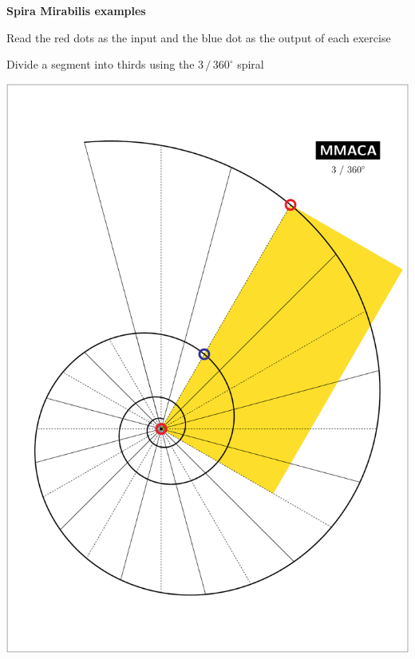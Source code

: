 \documentclass[a4paper,12pt]{article}
\begin{document}
    \newpage


    \phantom{.}
    \vspace{26em}

    {\huge \bf Spira Mirabilis examples}

    \bigskip

    {\large Read the red dots as the input and the blue dot as the output of each exercise}

    \newpage


    \begin{center}
    
        \large

        Divide a segment into thirds using the $3 \, / \, 360^{\circ}$ spiral

        \bigskip \bigskip \bigskip
    
        \includegraphics[scale=0.7071]{./pictures/Example_03}

    \end{center}
\end{document}
